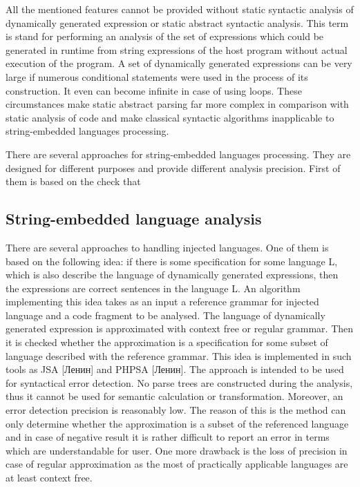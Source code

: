 \documentclass{sigplanconf}
\begin{document}
All the mentioned features cannot be provided without static syntactic analysis of dynamically generated expression or static abstract syntactic analysis. This term is stand for performing an analysis of the set of expressions which could be generated in runtime from string expressions of the host program without actual execution of the program. A set of dynamically generated expressions can be very large if numerous conditional statements were used in the process of its construction. It even can become infinite in case of using loops. These circumstances make static abstract parsing far more complex in comparison with static analysis of code and make classical syntactic algorithms inapplicable to string-embedded languages processing.

There are several approaches for string-embedded languages processing. They are designed for different purposes and provide different analysis precision. First of them is based on the check that

\subsection{String-embedded language analysis}
There are several approaches to handling injected languages. One of them is based on the following idea: if there is some specification for some language L, which is also describe the language of dynamically generated expressions, then the expressions are correct sentences in the language L. An algorithm implementing this idea takes as an input a reference grammar for injected language and a code fragment to be analysed. The language of dynamically generated expression is approximated with context free or regular grammar. Then it is checked whether the approximation is a specification for some subset of language described with the reference grammar. This idea is implemented in such tools as JSA [Ленин] and PHPSA [Ленин]. The approach is intended to be used for syntactical error detection. No parse trees are constructed during the analysis, thus it cannot be used for semantic calculation or transformation. Moreover, an error detection precision is reasonably low. The reason of this is the method can only determine whether the approximation is a subset of the referenced language and in case of negative result it is rather difficult to report an error in terms which are understandable for user. One more drawback is the loss of precision in case of regular approximation as the most of practically applicable languages are at least context free. 
\end{document}
